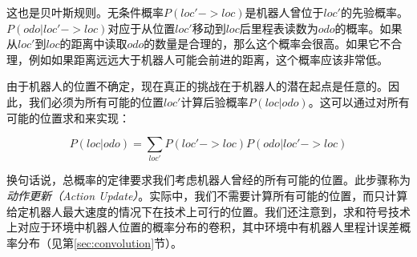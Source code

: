 这也是贝叶斯规则。无条件概率$P(loc'->loc)$是机器人曾位于$loc'$的先验概率。$P(odo|loc'->loc)$对应于从位置$loc'$移动到$loc$后里程表读数为$odo$的概率。如果从$loc'$到$loc$的距离中读取$odo$的数量是合理的，那么这个概率会很高。如果它不合理，例如如果距离远远大于机器人可能会前进的距离，这个概率应该非常低。


由于机器人的位置不确定，现在真正的挑战在于机器人的潜在起点是任意的。因此，我们必须为所有可能的位置$loc'$计算后验概率$P(loc|odo)$。这可以通过对所有可能的位置求和来实现：

\begin{equation}
P(loc|odo)=\sum_{loc'}P(loc'->loc)P(odo|loc'->loc)
\end{equation}


换句话说，总概率的定律要求我们考虑机器人曾经的所有可能的位置。此步骤称为\emph{动作更新（Action Update）}。实际中，我们不需要计算所有可能的位置，而只计算给定机器人最大速度的情况下在技术上可行的位置。我们还注意到，求和符号技术上对应于环境中机器人位置的概率分布的卷积，其中环境中有机器人里程计误差概率分布（见第\ref{sec:convolution}节）。


